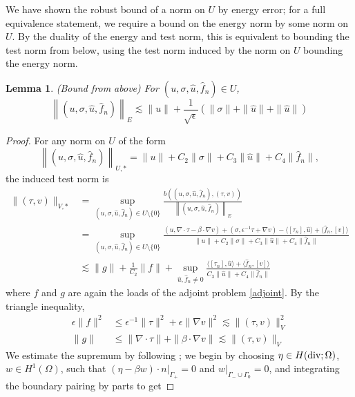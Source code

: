 \documentclass[11pt,onecolumn]{scrartcl}
\newcommand{\grad}{\nabla}
\renewcommand{\div}{\grad \cdot}
\newtheorem{lemma}{Lemma}
\begin{document}
We have shown the robust bound of a norm on $U$ by energy error; for a full equivalence statement, we require a bound on the energy norm by some norm on $U$.  By the duality of the energy and test norm, this is equivalent to bounding the test norm from below, using the test norm induced by the norm on $U$ bounding the energy norm.  
\begin{lemma}

(Bound from above) For $\left(u,\sigma,\widehat{u},\widehat{f}_n\right) \in U$,
\[
\left\|\left(u,\sigma,\widehat{u},\widehat{f}_n\right)\right\|_E \lesssim \|u\| + \frac{1}{\sqrt{\epsilon}}\left(\|\sigma\| + \|\widehat{u}\|+ \|\widehat{u}\|\right)
\]

\end{lemma}
\begin{proof}
For any norm on $U$ of the form
\[
\left\|\left(u,\sigma,\widehat{u},\widehat{f}_n\right)\right\|_{U,*} = \|u\| + C_2 \|\sigma\| + C_3 \|\widehat{u}\| + C_4 \|\widehat{f}_n\|,
\]
the induced test norm is  
\begin{align*}
\| \left(\tau,v\right) \|_{V,*} &= \sup_{\left(u,\sigma,\widehat{u},\widehat{f}_n\right) \in U\setminus \{0\}} \frac{b\left(\left(u,\sigma,\widehat{u},\widehat{f}_n\right),\left(\tau,v\right)\right)}{\left\|\left(u,\sigma,\widehat{u},\widehat{f}_n\right)\right\|_E} \\
& = \sup_{\left(u,\sigma,\widehat{u},\widehat{f}_n\right) \in U\setminus \{0\}} \frac{\left(u,\div \tau - \beta \cdot \grad v\right) + \left(\sigma, \epsilon^{-1} \tau + \grad v\right) - \langle \left[\tau_n\right], \widehat{u} \rangle + \langle \widehat{f}_n, \left[v\right] \rangle
}{\|u\| + C_2 \|\sigma\| + C_3 \|\widehat{u}\| + C_4 \|\widehat{f}_n\|} \\
&\lesssim \|g\| + \frac{1}{C_2}\|f\| + \sup_{\widehat{u},\widehat{f}_n \neq 0}\frac{\langle \left[\tau_n\right], \widehat{u} \rangle + \langle \widehat{f}_n, \left[v\right] \rangle}{C_3\|\widehat{u}\| + C_4\|\widehat{f}_n\|}
\end{align*}
where $f$ and $g$ are again the loads of the adjoint problem \eqref{adjoint}.  By the triangle inequality, 
\begin{align*}
\epsilon \|f \|^2 &\leq \epsilon^{-1} \| \tau\|^2 + {\epsilon} \|\grad v\|^2 \lesssim \| \left(\tau,v\right)\|_V^2\\
\|g \| &\leq \|\div \tau\| +  \|\beta \cdot \grad v\| \lesssim \| \left(\tau,v\right)\|_V
\end{align*}
We estimate the supremum by following \cite{DPGrobustness}; we begin by choosing $\eta \in H({\rm div}; \Omega)$, $w\in H^1(\Omega)$, such that $\left.\left(\eta-\beta w \right)\cdot n\right |_{\Gamma_+} = 0$ and $\left.w\right |_{\Gamma_-\cup\Gamma_0} = 0$, and integrating the boundary pairing by parts to get

\end{proof}
\end{document}
